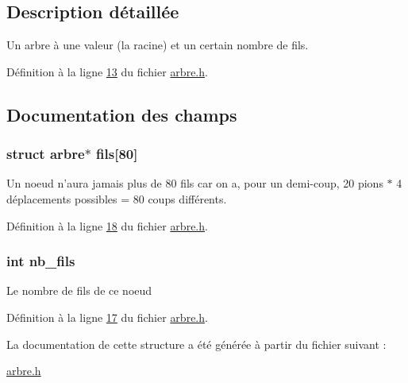 \subsection{Description détaillée}
Un arbre à une valeur (la racine) et un certain nombre de fils. 

Définition à la ligne \hyperlink{arbre_8h_source_l00013}{13} du fichier \hyperlink{arbre_8h_source}{arbre.h}.



\subsection{Documentation des champs}
\hypertarget{structarbre_a7bac08e3c2aedbde0dddf80b94eadf76}{
\subsubsection[{fils}]{\setlength{\rightskip}{0pt plus 5cm}struct {\bf arbre}$\ast$ {\bf fils}\mbox{[}80\mbox{]}}}
\label{structarbre_a7bac08e3c2aedbde0dddf80b94eadf76}
Un noeud n'aura jamais plus de 80 fils car on a, pour un demi-\/coup, 20 pions $\ast$ 4 déplacements possibles = 80 coups différents. 

Définition à la ligne \hyperlink{arbre_8h_source_l00018}{18} du fichier \hyperlink{arbre_8h_source}{arbre.h}.

\hypertarget{structarbre_a67c44f020d501282adc38e3301a5f245}{
\subsubsection[{nb\_\-fils}]{\setlength{\rightskip}{0pt plus 5cm}int {\bf nb\_\-fils}}}
\label{structarbre_a67c44f020d501282adc38e3301a5f245}
Le nombre de fils de ce noeud 

Définition à la ligne \hyperlink{arbre_8h_source_l00017}{17} du fichier \hyperlink{arbre_8h_source}{arbre.h}.



La documentation de cette structure a été générée à partir du fichier suivant :\begin{DoxyCompactItemize}
\item 
\hyperlink{arbre_8h}{arbre.h}\end{DoxyCompactItemize}
